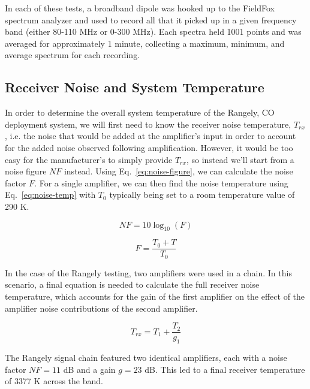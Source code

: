 \documentclass[11pt]{article}
\begin{document}
In each of these tests, a broadband dipole was hooked up to the FieldFox 
spectrum analyzer and used to record all that it picked up in a given frequency 
band (either 80-110 MHz or 0-300 MHz). Each spectra held 1001 points and was 
averaged for approximately 1 minute, collecting a maximum, minimum, and average 
spectrum for each recording.

\citep{pritchard-loeb2010}

\subsection{Receiver Noise and System Temperature}

In order to determine the overall system temperature of the Rangely, CO 
deployment system, we will first need to know the receiver noise temperature, 
$T_{rx}$, i.e.  the noise that would be added at the amplifier's input in order 
to account for the added noise observed following amplification. However, it 
would be too easy for the manufacturer's to simply provide $T_{rx}$, so instead 
we'll start from a noise figure $NF$ instead. Using 
Eq.~\eqref{eq:noise-figure}, we can calculate the noise factor $F$. For a 
single amplifier, we can then find the noise temperature using 
Eq.~\eqref{eq:noise-temp} with $T_0$ typically being set to a room temperature 
value of 290 K.

\begin{equation}
    \label{eq:noise-figure}
    NF = 10 \log_{10}(F)
\end{equation}

\begin{equation}
    \label{eq:noise-temp}
    F = \frac{T_0 + T}{T_0}
\end{equation}

In the case of the Rangely testing, two amplifiers were used in a chain. In 
this scenario, a final equation is needed to calculate the full receiver noise 
temperature, which accounts for the gain of the first amplifier on the effect 
of the amplifier noise contributions of the second amplifier. 

\begin{equation}
    \label{eq:receiver-temp}
    T_{rx} = T_1 + \frac{T_2}{g_1}
\end{equation}

The Rangely signal chain featured two identical amplifiers, each with a noise 
factor $NF = 11$ dB and a gain $g = 23$ dB. This led to a final receiver 
temperature of 3377 K across the band.
\end{document}
